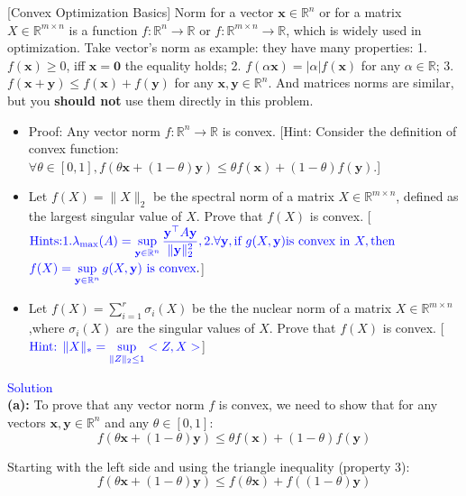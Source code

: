 \item {} [Convex Optimization Basics] Norm for a vector $\mathbf{x}\in\mathbb{R}^n$ or for a matrix $X\in\mathbb{R}^{m\times n}$ is a function $f:\mathbb{R}^{n}\rightarrow\mathbb{R}$ or $f:\mathbb{R}^{m\times n}\rightarrow\mathbb{R}$, which is widely used in optimization. Take vector's norm as example: they have many properties: 1. $f(\mathbf{x})\geq 0$, iff $\mathbf{x}=\mathbf{0}$ the equality holds; 2. $f(\alpha\mathbf{x})=|\alpha| f(\mathbf{x})$ for any $\alpha\in\mathbb{R}$; 3. $f(\mathbf{x}+\mathbf{y})\leq f(\mathbf{x})+f(\mathbf{y})$ for any $\mathbf{x},\mathbf{y}\in\mathbb{R}^n$. And matrices norms are similar, but you \textbf{should not} use them directly in this problem.
\begin{itemize}
    \item[(a)] Proof: Any vector norm $f:\mathbb{R}^{n}\rightarrow\mathbb{R}$ is convex. [Hint: Consider the definition of convex function: $\forall\theta\in[0,1], f(\theta\mathbf{x}+(1-\theta)\mathbf{y})\leq \theta f(\mathbf{x})+(1-\theta)f(\mathbf{y})$.] ~
    \item[(b)] Let $f(X) = \|X\|_2$ be the spectral norm of a matrix $X \in \mathbb{R}^{m \times n}$, defined as the largest singular value of $X$. Prove that $f(X)$ is convex. [$\textcolor{blue}{\text{Hints:} 1. \lambda_{\max}(A)=\sup\limits_{\mathbf{y}\in\mathbb{R}^n}\dfrac{\mathbf{y}^{\top}A\mathbf{y}}{\|\mathbf{y}\|_2^2}, 2. \forall\mathbf{y}, \text{if } g(X,\mathbf{y}) \text{is convex in } X, \text{then }}$ $\textcolor{blue}{f(X)=\sup\limits_{\mathbf{y}\in\mathbb{R}^n}g(X,\mathbf{y}) \text{ is convex}}.$] 
    \item[(c)] Let $f(X) = \sum\limits_{i=1}^{r} \sigma_i(X)$ be the the nuclear norm of  a matrix $X \in \mathbb{R}^{m \times n}$,where $\sigma_i(X)$ are the singular values of $X$. Prove that $f(X)$ is convex. [$\textcolor{blue}{\text{Hint: } \|X\|_* = \sup\limits_{\|Z\|_2 \leq 1} <Z,X>}$] 
\end{itemize}

\textcolor{blue}{Solution} \\

\textbf{(a):} To prove that any vector norm $f$ is convex, we need to show that for any vectors $\mathbf{x},\mathbf{y}\in\mathbb{R}^n$ and any $\theta\in[0,1]$:
$$f(\theta\mathbf{x}+(1-\theta)\mathbf{y})\leq \theta f(\mathbf{x})+(1-\theta)f(\mathbf{y})$$

Starting with the left side and using the triangle inequality (property 3):
$$f(\theta\mathbf{x}+(1-\theta)\mathbf{y}) \leq f(\theta\mathbf{x}) + f((1-\theta)\mathbf{y})$$


